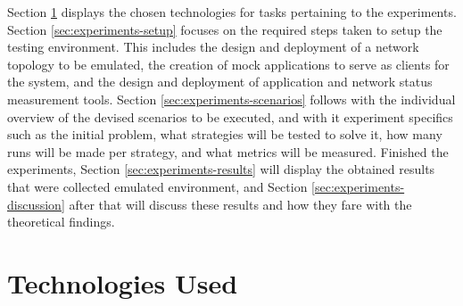     Section \ref{sec:experiments-technologies} displays the chosen technologies for tasks pertaining to the experiments.
    Section \ref{sec:experiments-setup} focuses on the required steps taken to setup the testing environment.
    This includes the design and deployment of a network topology to be emulated, the creation of mock applications to serve as clients for the system, and the design and deployment of application and network status measurement tools.
    Section \ref{sec:experiments-scenarios} follows with the individual overview of the devised scenarios to be executed, and with it experiment specifics such as the initial problem, what strategies will be tested to solve it, how many runs will be made per strategy, and what metrics will be measured.
    Finished the experiments, Section \ref{sec:experiments-results} will display the obtained results that were collected emulated environment, and Section \ref{sec:experiments-discussion} after that will discuss these results and how they fare with the theoretical findings.

\section{Technologies Used}

\label{sec:experiments-technologies}

